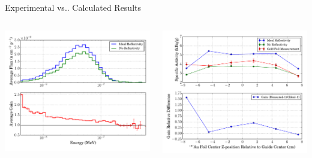 \documentclass[final,t]{beamer}
\makeatletter
\DeclareRobustCommand\onedot{\futurelet\@let@token\@onedot}
\def\@onedot{\ifx\@let@token.\else.\null\fi\xspace}
\def\vs{{vs}\onedot}
\makeatother
\begin{document}
\begin{frame}{}
\begin{columns}[t]
\begin{column}{.3\linewidth}
\begin{block}{Experimental \vs Calculated Results}
\begin{columns}
      \begin{column}{0.5\linewidth}
      \vspace{-4ex}
      \begin{center}
      \includegraphics*[width=\linewidth]{gain.pdf}
      \end{center}
      \end{column}
      \begin{column}{0.5\linewidth}
      \vspace{-4ex}
      \begin{center}
      \includegraphics*[width=\linewidth]{GF_act.pdf}
      \end{center}
      \end{column}


\end{columns}
\end{block}
\end{column}
\end{columns}
\end{frame}
\end{document}
